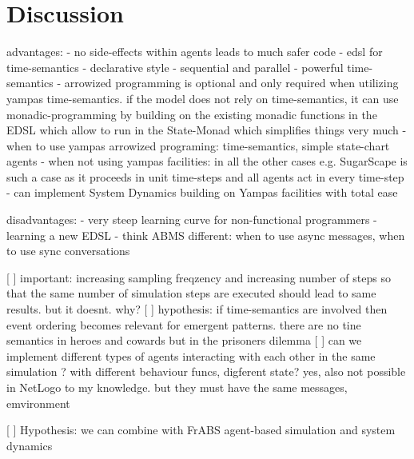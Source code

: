 \section{Discussion}

advantages:
	- no side-effects within agents leads to much safer code
	- edsl for time-semantics
	- declarative style
	- sequential and parallel
	- powerful time-semantics
	- arrowized programming is optional and only required when utilizing yampas time-semantics. if the model does not rely on time-semantics, it can use monadic-programming by building on the existing monadic functions in the EDSL which allow to run in the State-Monad which simplifies things very much
	- when to use yampas arrowized programing: time-semantics, simple state-chart agents 
	- when not using yampas facilities: in all the other cases e.g. SugarScape is such a case as it proceeds in unit time-steps and all agents act in every time-step
	- can implement System Dynamics building on Yampas facilities with total ease	
	
disadvantages:
	- very steep learning curve for non-functional programmers
	- learning a new EDSL
	- think ABMS different: when to use async messages, when to use sync conversations


[ ] important: increasing sampling freqzency and increasing number of steps so that the same number of simulation steps are executed should lead to same results. but it doesnt. why?
[ ] hypothesis: if time-semantics are involved then event ordering becomes relevant for emergent patterns. there are no tine semantics in heroes and cowards but in the prisoners dilemma
[ ] can we implement different types of agents interacting with each other in the same simulation ? with different behaviour funcs, digferent state? yes, also not possible in NetLogo to my knowledge. but they must have the same messages, emvironment 

[ ] Hypothesis: we can combine with FrABS agent-based simulation and system dynamics